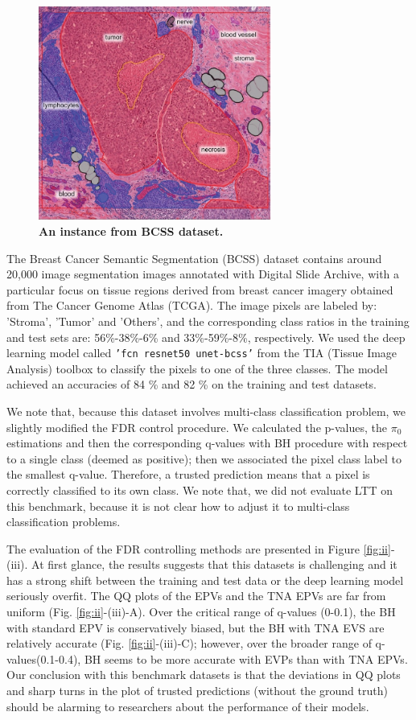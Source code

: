 \documentclass{article}
\begin{document}
\begin{figure}[h!]
	\centering
	\includegraphics[width=3in]{img/bcss_instance.jpeg}
	\caption{{\bf An instance from BCSS dataset.}}
	\label{fig:bcss_example}
\end{figure} 

The Breast Cancer Semantic Segmentation (BCSS) dataset \cite{Amgad2019StructuredCE} contains around 20,000 image segmentation images annotated with Digital Slide Archive, with a particular focus on tissue regions derived from breast cancer imagery obtained from The Cancer Genome Atlas (TCGA). The image pixels are labeled by: 'Stroma', 'Tumor' and 'Others', and the corresponding class ratios in the training and test sets are: 56\%-38\%-6\% and 33\%-59\%-8\%, respectively. We used the deep learning model called \texttt{'fcn resnet50 unet-bcss'} from the TIA (Tissue Image Analysis) toolbox \cite{Pocock2022} to classify the pixels to one of the three classes. The model achieved an accuracies of 84 \% and 82 \% on the training and test datasets. 

We note that, because this dataset involves multi-class classification problem, we slightly modified the FDR control procedure. We calculated the p-values, the $\pi_0$ estimations and then the corresponding q-values with BH procedure with respect to a single class (deemed as positive); then we associated the pixel class label to the smallest q-value. Therefore, a trusted prediction means that a pixel is correctly classified to its own class. We note that, we did not evaluate LTT on this benchmark, because it is not clear how to adjust it to multi-class classification problems.

The evaluation of the FDR controlling methods are presented in Figure \ref{fig:ii}-(iii). At first glance, the results suggests that this datasets is challenging and it  has a strong shift between the training and test data or the deep learning model seriously overfit. The QQ plots of the EPVs and the TNA EPVs are far from uniform (Fig. \ref{fig:ii}-(iii)-A). Over the critical range of q-values (0-0.1), the BH with standard EPV is conservatively biased, but the BH with TNA EVS are relatively accurate (Fig. \ref{fig:ii}-(iii)-C); however, over the broader range of q-values(0.1-0.4), BH seems to be more accurate with EVPs than with TNA EPVs. Our conclusion with this benchmark datasets is that the deviations in QQ plots and sharp turns in the plot of trusted predictions (without the ground truth) should be alarming to researchers about the performance of their models. 
\end{document}
